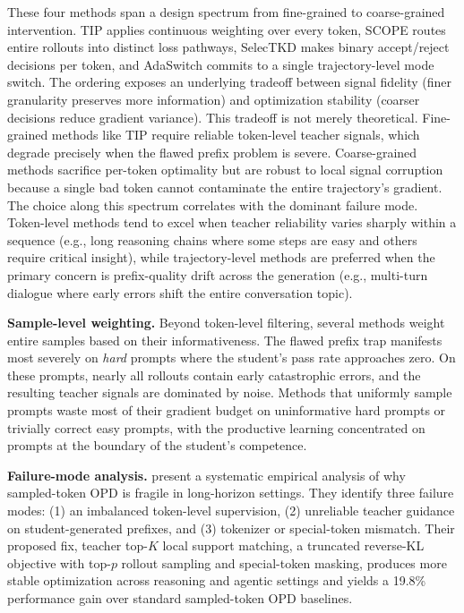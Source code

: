 \documentclass{article} %
\begin{document}
These four methods span a design spectrum from fine-grained to coarse-grained intervention. TIP applies continuous weighting over every token, SCOPE routes entire rollouts into distinct loss pathways, SelecTKD makes binary accept/reject decisions per token, and AdaSwitch commits to a single trajectory-level mode switch. The ordering exposes an underlying tradeoff between signal fidelity (finer granularity preserves more information) and optimization stability (coarser decisions reduce gradient variance). This tradeoff is not merely theoretical. Fine-grained methods like TIP require reliable token-level teacher signals, which degrade precisely when the flawed prefix problem is severe. Coarse-grained methods sacrifice per-token optimality but are robust to local signal corruption because a single bad token cannot contaminate the entire trajectory's gradient. The choice along this spectrum correlates with the dominant failure mode. Token-level methods tend to excel when teacher reliability varies sharply within a sequence (e.g., long reasoning chains where some steps are easy and others require critical insight), while trajectory-level methods are preferred when the primary concern is prefix-quality drift across the generation (e.g., multi-turn dialogue where early errors shift the entire conversation topic).

\textbf{Sample-level weighting.} Beyond token-level filtering, several methods weight entire samples based on their informativeness. The flawed prefix trap manifests most severely on \emph{hard} prompts where the student's pass rate approaches zero. On these prompts, nearly all rollouts contain early catastrophic errors, and the resulting teacher signals are dominated by noise. Methods that uniformly sample prompts waste most of their gradient budget on uninformative hard prompts or trivially correct easy prompts, with the productive learning concentrated on prompts at the boundary of the student's competence.

\textbf{Failure-mode analysis.} \citet{2603.25562} present a systematic empirical analysis of why sampled-token OPD is fragile in long-horizon settings. They identify three failure modes: (1) an imbalanced token-level supervision, (2) unreliable teacher guidance on student-generated prefixes, and (3) tokenizer or special-token mismatch. Their proposed fix, teacher top-$K$ local support matching, a truncated reverse-KL objective with top-$p$ rollout sampling and special-token masking, produces more stable optimization across reasoning and agentic settings and yields a 19.8\% performance gain over standard sampled-token OPD baselines.
\end{document}
